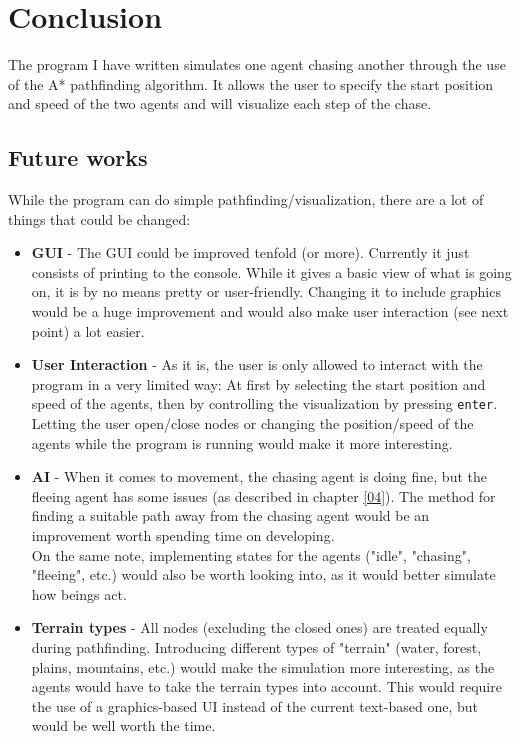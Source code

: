 \section{Conclusion}
\label{05}

The program I have written simulates one agent chasing another through the use of the A* pathfinding algorithm. It allows the user to specify the start position and speed of the two agents and will visualize each step of the chase.

\subsection{Future works}
\label{05_01}

While the program can do simple pathfinding/visualization, there are a lot of things that could be changed:

\begin{itemize}

	\item \textbf{GUI} - The GUI could be improved tenfold (or more). Currently it just consists of printing to the console. While it gives a basic view of what is going on, it is by no means pretty or user-friendly. Changing it to include graphics would be a huge improvement and would also make user interaction (see next point) a lot easier.

	\item \textbf{User Interaction} - As it is, the user is only allowed to interact with the program in a very limited way: At first by selecting the start position and speed of the agents, then by controlling the visualization by pressing \texttt{enter}. Letting the user open/close nodes or changing the position/speed of the agents while the program is running would make it more interesting.

	\item \textbf{AI} - When it comes to movement, the chasing agent is doing fine, but the fleeing agent has some issues (as described in chapter \ref{04}). The method for finding a suitable path away from the chasing agent would be an improvement worth spending time on developing.
	\\ On the same note, implementing states for the agents ("idle", "chasing", "fleeing", etc.) would also be worth looking into, as it would better simulate how beings act.

	\item \textbf{Terrain types} - All nodes (excluding the closed ones) are treated equally during pathfinding. Introducing different types of "terrain" (water, forest, plains, mountains, etc.) would make the simulation more interesting, as the agents would have to take the terrain types into account. This would require the use of a graphics-based UI instead of the current text-based one, but would be well worth the time.

\end{itemize}